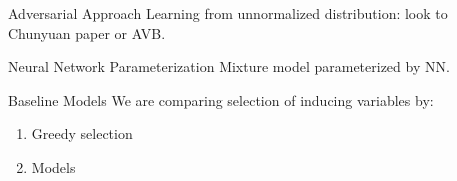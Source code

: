 \documentclass{beamer}
\begin{document}
\begin{frame}{Adversarial Approach}
Learning from unnormalized distribution: look to Chunyuan paper or AVB.
\end{frame}

\begin{frame}{Neural Network Parameterization}
Mixture model parameterized by NN.
\end{frame}

\begin{frame}{Baseline Models}
We are comparing selection of inducing variables by:
\begin{enumerate}
	\item Greedy selection
	\item Models
\end{enumerate}
\end{frame}
\end{document}
